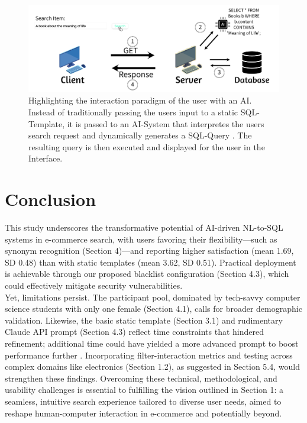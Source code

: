 \documentclass[manuscript,review]{acmart}
\begin{document}
\begin{figure}[h]
  \includegraphics[width=\textwidth]{images/front_image}
  \caption{Highlighting the interaction paradigm of the user with an AI. Instead
  of traditionally passing the users input to a static SQL-Template, it is passed 
  to an AI-System that interpretes the users search request and dynamically generates a SQL-Query
  . The resulting query is then executed and displayed for the user in the Interface.}
\end{figure}












\section{Conclusion}
This study underscores the transformative potential of AI-driven NL-to-SQL systems in e-commerce search, with 
users favoring their flexibility—such as synonym recognition (Section 4)—and reporting higher satisfaction 
(mean 1.69, SD 0.48) than with static templates (mean 3.62, SD 0.51). Practical deployment is achievable through 
our proposed blacklist configuration (Section 4.3), which could effectively mitigate security vulnerabilities.\\
Yet, limitations persist. The participant pool, dominated by tech-savvy computer science students with 
only one female (Section 4.1), calls for broader demographic validation. Likewise, the basic static 
template (Section 3.1) and rudimentary Claude API prompt (Section 4.3) reflect time constraints that 
hindered refinement; additional time could have yielded a more advanced prompt to boost performance further \cite{gaoTextSQLEmpoweredLarge2023}. 
Incorporating filter-interaction metrics and testing across complex domains like electronics (Section 1.2), as 
suggested in Section 5.4, would strengthen these findings. Overcoming these technical, methodological, and 
usability challenges is essential to fulfilling the vision outlined in Section 1: a seamless, intuitive search 
experience tailored to diverse user needs, aimed to reshape human-computer interaction in e-commerce and potentially beyond.
\end{document}
